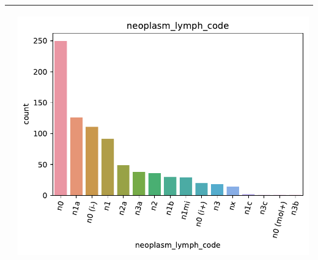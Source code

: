 \begin{table}[!htb]
\begin{threeparttable}
\begin{tabular}{p{8cm} p{7cm}}
			& \begin{center}\includegraphics[width=1\linewidth]{NOTEBOOK/IMAGENES_DESCRIPTIVAS/3_neoplasm_lymph_code}\end{center}
			\\ \hline
		\end{tabular}
	\end{threeparttable}
\end{table}

